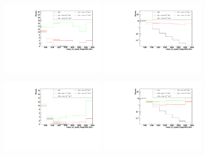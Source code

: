 \begin{figure}[h]
  \begin{center}
	\includegraphics[width=0.45\textwidth]{Plots/aQGC_kinematics/mass_lvj_type0_PuppiAK8_8bin_FS1.pdf}%
	\includegraphics[width=0.45\textwidth]{Plots/aQGC_kinematics/mass_lvj_type0_PuppiAK8_8bin_FS1_log.pdf}\\	
    \caption{}
  \end{center}
\end{figure}
\begin{figure}[h]
  \begin{center}
	\includegraphics[width=0.45\textwidth]{Plots/aQGC_kinematics/mass_lvj_type0_PuppiAK8_8bin_FT0.pdf}%
	\includegraphics[width=0.45\textwidth]{Plots/aQGC_kinematics/mass_lvj_type0_PuppiAK8_8bin_FT0_log.pdf}\\	
    \caption{}
  \end{center}
\end{figure}
